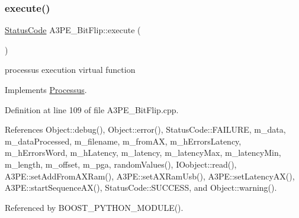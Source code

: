 \subsubsection{\texorpdfstring{execute()}{execute()}}
{\footnotesize\ttfamily \hyperlink{classStatusCode}{Status\+Code} A3\+P\+E\+\_\+\+Bit\+Flip\+::execute (\begin{DoxyParamCaption}{ }\end{DoxyParamCaption})\hspace{0.3cm}{\ttfamily [virtual]}}

processus execution virtual function 

Implements \hyperlink{classProcessus_a63767a63a1fb0055c5aa45b21a4a5d58}{Processus}.



Definition at line 109 of file A3\+P\+E\+\_\+\+Bit\+Flip.\+cpp.



References Object\+::debug(), Object\+::error(), Status\+Code\+::\+F\+A\+I\+L\+U\+RE, m\+\_\+data, m\+\_\+data\+Processed, m\+\_\+filename, m\+\_\+from\+AX, m\+\_\+h\+Errors\+Latency, m\+\_\+h\+Errors\+Word, m\+\_\+h\+Latency, m\+\_\+latency, m\+\_\+latency\+Max, m\+\_\+latency\+Min, m\+\_\+length, m\+\_\+offset, m\+\_\+pga, random\+Values(), I\+Oobject\+::read(), A3\+P\+E\+::set\+Add\+From\+A\+X\+Ram(), A3\+P\+E\+::set\+A\+X\+Ram\+Usb(), A3\+P\+E\+::set\+Latency\+A\+X(), A3\+P\+E\+::start\+Sequence\+A\+X(), Status\+Code\+::\+S\+U\+C\+C\+E\+SS, and Object\+::warning().



Referenced by B\+O\+O\+S\+T\+\_\+\+P\+Y\+T\+H\+O\+N\+\_\+\+M\+O\+D\+U\+L\+E().


